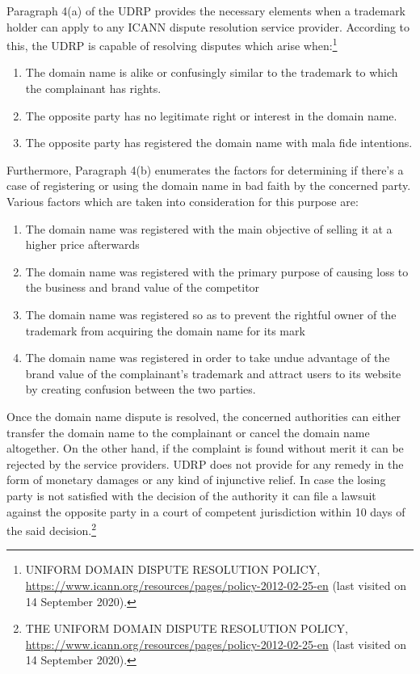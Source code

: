 \begin{multicols}{2}
\noi
Paragraph 4(a) of the UDRP provides the necessary elements when a trademark holder can
apply to any ICANN dispute resolution service provider. According to this, the UDRP is
capable of resolving disputes which arise when:\footnote{UNIFORM DOMAIN DISPUTE RESOLUTION POLICY,
\url{https://www.icann.org/resources/pages/policy-2012-02-25-en} (last visited on 14 September 2020).}

\begin{enumerate}[label=$\bullet$]
\item The domain name is alike or confusingly similar to the trademark to which the
complainant has rights.

\item The opposite party has no legitimate right or interest in the domain name.

\item The opposite party has registered the domain name with mala fide intentions.
\end{enumerate}

\noi
Furthermore, Paragraph 4(b) enumerates the factors for determining if there’s a case of
registering or using the domain name in bad faith by the concerned party. Various factors
which are taken into consideration for this purpose are:

\begin{enumerate}[label=$\bullet$]
\item The domain name was registered with the main objective of selling it at a higher price
afterwards

\item The domain name was registered with the primary purpose of causing loss to the
business and brand value of the competitor

\item The domain name was registered so as to prevent the rightful owner of the trademark
from acquiring the domain name for its mark

\item The domain name was registered in order to take undue advantage of the brand value
of the complainant’s trademark and attract users to its website by creating confusion
between the two parties. 
\end{enumerate}

\noi
Once the domain name dispute is resolved, the concerned authorities can either transfer the
domain name to the complainant or cancel the domain name altogether. On the other hand, if
the complaint is found without merit it can be rejected by the service providers. UDRP does
not provide for any remedy in the form of monetary damages or any kind of injunctive relief.
In case the losing party is not satisfied with the decision of the authority it can file a lawsuit
against the opposite party in a court of competent jurisdiction within 10 days of the said
decision.\footnote{THE UNIFORM DOMAIN DISPUTE RESOLUTION POLICY, \url{https://www.icann.org/resources/pages/policy-2012-02-25-en} (last visited on 14 September 2020).}


\end{multicols}
